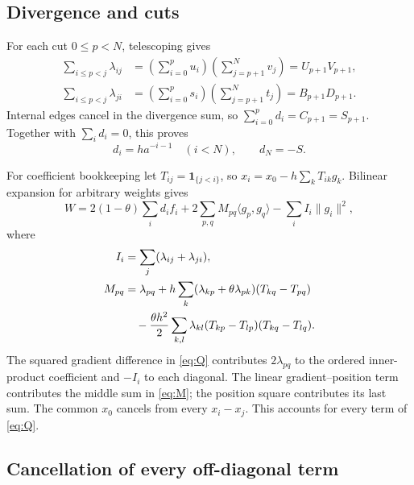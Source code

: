 \documentclass[11pt]{article}
\numberwithin{equation}{section}
\theoremstyle{remark}
\newcommand{\ip}[2]{\langle #1,#2\rangle}
\newcommand{\norm}[1]{\lVert #1\rVert}
\newcommand{\one}{\mathbf 1}
\begin{document}
\subsection{Divergence and cuts}

For each cut $0\leq p<N$, telescoping gives
\begin{align*}
\sum_{i\leq p<j}\lambda_{ij}
&=\left(\sum_{i=0}^pu_i\right)
  \left(\sum_{j=p+1}^Nv_j\right)=U_{p+1}V_{p+1},\\
\sum_{i\leq p<j}\lambda_{ji}
&=\left(\sum_{i=0}^ps_i\right)
  \left(\sum_{j=p+1}^Nt_j\right)=B_{p+1}D_{p+1}.
\end{align*}
Internal edges cancel in the divergence sum, so
$\sum_{i=0}^{p}d_i=C_{p+1}=S_{p+1}$.
Together with $\sum_i d_i=0$, this proves
\begin{equation}
d_i=ha^{-i-1}\quad(i<N),\qquad d_N=-S.
\label{eq:divergence}
\end{equation}

For coefficient bookkeeping let $T_{ij}=\one_{\{j<i\}}$, so
$x_i=x_0-h\sum_kT_{ik}g_k$. Bilinear expansion for arbitrary weights gives
\begin{equation}
W=2(1-\theta)\sum_i d_if_i
 +2\sum_{p,q}M_{pq}\ip{g_p}{g_q}
 -\sum_i I_i\norm{g_i}^2,
\label{eq:general-expansion}
\end{equation}
where
\begin{align}
I_i&=\sum_j(\lambda_{ij}+\lambda_{ji}),\label{eq:incident}\\
M_{pq}&=\lambda_{pq}
 +h\sum_k(\lambda_{kp}+\theta\lambda_{pk})(T_{kq}-T_{pq})\notag\\
&\quad-\frac{\theta h^2}{2}
 \sum_{k,l}\lambda_{kl}(T_{kp}-T_{lp})(T_{kq}-T_{lq}).
\label{eq:M}
\end{align}
The squared gradient difference in \eqref{eq:Q} contributes
$2\lambda_{pq}$ to the ordered inner-product coefficient and $-I_i$
to each diagonal. The linear gradient--position term contributes
the middle sum in \eqref{eq:M}; the position square contributes its
last sum. The common $x_0$ cancels from every $x_i-x_j$.
This accounts for every term of \eqref{eq:Q}.

\subsection{Cancellation of every off-diagonal term}
\end{document}
